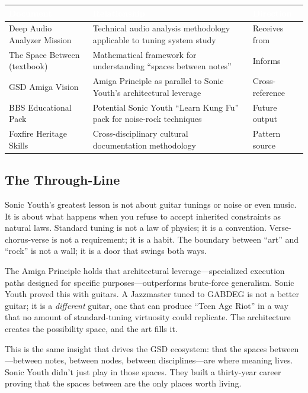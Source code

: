 \documentclass[11pt,letterpaper]{article}
\newcommand{\tableheader}[1]{\textbf{\sffamily\textcolor{white}{#1}}}
\begin{document}
\begin{center}
\begin{tabularx}{\textwidth}{L{4cm}XC{2cm}}
\toprule
{}
\tableheader{Document} & \tableheader{Relationship} & \tableheader{Direction} \\
\midrule
Deep Audio Analyzer Mission & Technical audio analysis methodology applicable to tuning system study & Receives from \\
The Space Between (textbook) & Mathematical framework for understanding ``spaces between notes'' & Informs \\
GSD Amiga Vision & Amiga Principle as parallel to Sonic Youth's architectural leverage & Cross-reference \\
BBS Educational Pack & Potential Sonic Youth ``Learn Kung Fu'' pack for noise-rock techniques & Future output \\
Foxfire Heritage Skills & Cross-disciplinary cultural documentation methodology & Pattern source \\
\bottomrule
\end{tabularx}
\end{center}

\subsection{The Through-Line}

Sonic Youth's greatest lesson is not about guitar tunings or noise or even music. It is about what happens when you refuse to accept inherited constraints as natural laws. Standard tuning is not a law of physics; it is a convention. Verse-chorus-verse is not a requirement; it is a habit. The boundary between ``art'' and ``rock'' is not a wall; it is a door that swings both ways.

The Amiga Principle holds that architectural leverage---specialized execution paths designed for specific purposes---outperforms brute-force generalism. Sonic Youth proved this with guitars. A Jazzmaster tuned to GABDEG is not a better guitar; it is a \textit{different} guitar, one that can produce ``Teen Age Riot'' in a way that no amount of standard-tuning virtuosity could replicate. The architecture creates the possibility space, and the art fills it.

This is the same insight that drives the GSD ecosystem: that the spaces between---between notes, between nodes, between disciplines---are where meaning lives. Sonic Youth didn't just play in those spaces. They built a thirty-year career proving that the spaces between are the only places worth living.
\end{document}
